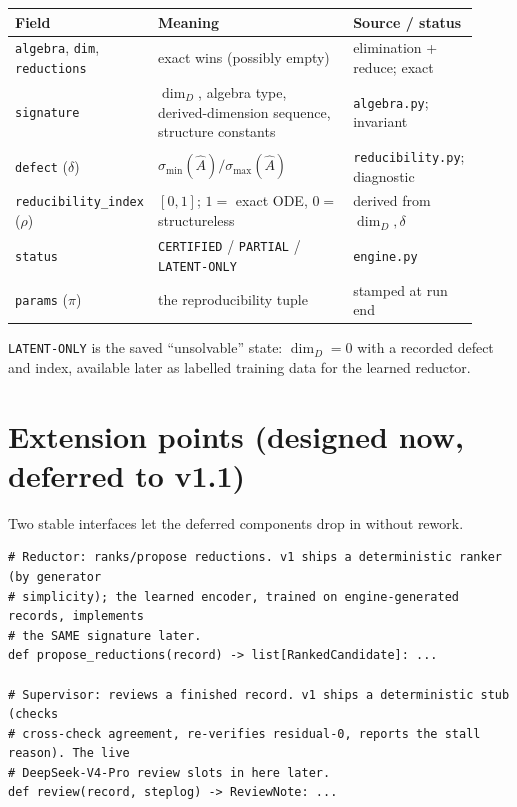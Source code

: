 \documentclass[11pt]{article}
\theoremstyle{definition}
\theoremstyle{remark}
\begin{document}
\begin{center}
\renewcommand{\arraystretch}{1.25}
\begin{tabular}{@{}p{0.26\linewidth} p{0.42\linewidth} p{0.24\linewidth}@{}}
\hline
\textbf{Field} & \textbf{Meaning} & \textbf{Source / status} \\ \hline
\texttt{algebra}, \texttt{dim}, \texttt{reductions} & exact wins (possibly empty) & elimination + reduce; exact \\
\texttt{signature} & $\dim_D$, algebra type, derived-dimension sequence, structure constants & \texttt{algebra.py}; invariant \\
\texttt{defect} ($\delta$) & $\sigma_{\min}(\hat A)/\sigma_{\max}(\hat A)$ & \texttt{reducibility.py}; diagnostic \\
\texttt{reducibility\_index} ($\rho$) & $[0,1]$; $1=$ exact ODE, $0=$ structureless & derived from $\dim_D,\delta$ \\
\texttt{status} & \texttt{CERTIFIED} / \texttt{PARTIAL} / \texttt{LATENT-ONLY} & \texttt{engine.py} \\
\texttt{params} ($\pi$) & the reproducibility tuple & stamped at run end \\ \hline
\end{tabular}
\end{center}

\noindent\texttt{LATENT-ONLY} is the saved ``unsolvable'' state: $\dim_D=0$ with a recorded defect
and index, available later as labelled training data for the learned reductor.

\section{Extension points (designed now, deferred to v1.1)}

Two stable interfaces let the deferred components drop in without rework.

\begin{verbatim}
# Reductor: ranks/propose reductions. v1 ships a deterministic ranker (by generator
# simplicity); the learned encoder, trained on engine-generated records, implements
# the SAME signature later.
def propose_reductions(record) -> list[RankedCandidate]: ...

# Supervisor: reviews a finished record. v1 ships a deterministic stub (checks
# cross-check agreement, re-verifies residual-0, reports the stall reason). The live
# DeepSeek-V4-Pro review slots in here later.
def review(record, steplog) -> ReviewNote: ...
\end{verbatim}
\end{document}
